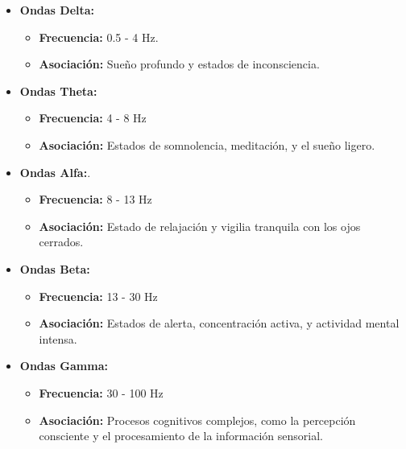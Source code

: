 \begin{itemize}

	\item
	\textbf{Ondas Delta:} 	
	\begin{itemize}
	
	\item
	\textbf{Frecuencia:} 0.5 - 4 Hz.
	\item 
	\textbf{Asociación:} Sueño profundo y estados de inconsciencia.
	\end{itemize}
	
	\item
	\textbf{Ondas Theta:}
	\begin{itemize}
	
	\item
	\textbf{Frecuencia:} 4 - 8 Hz
	\item 
	\textbf{Asociación:} Estados de somnolencia, meditación, y el sueño ligero.
	\end{itemize}
	
	\item
	\textbf{Ondas Alfa:}.
	\begin{itemize}
	
	\item
	\textbf{Frecuencia:} 8 - 13 Hz
	\item 
	\textbf{Asociación:} Estado de relajación y vigilia tranquila con los ojos cerrados.
	\end{itemize}



	\item
	\textbf{Ondas Beta:}
	\begin{itemize}
	
	\item
	\textbf{Frecuencia:} 13 - 30 Hz
	\item 
	\textbf{Asociación:} Estados de alerta, concentración activa, y actividad mental intensa.
	\end{itemize}
	
	\item
	\textbf{Ondas Gamma:}
	\begin{itemize}
	
	\item
	\textbf{Frecuencia:} 30 - 100 Hz
	\item 
	\textbf{Asociación:} Procesos cognitivos complejos, como la percepción consciente y el procesamiento de la información sensorial.
	\end{itemize}
\end{itemize}


